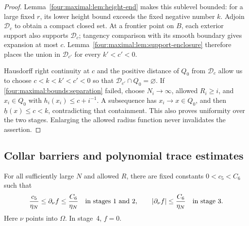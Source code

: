 \begin{proof}
Lemma~\ref{four:maximal:lem:height-end} makes this sublevel bounded: for a large
fixed $r$, its lower height bound exceeds the fixed negative number
$k$. Adjoin $\mathcal D_c$ to obtain a compact closed set. At a frontier
point on $B$, each exterior support also supports $\mathcal D_c$;
tangency comparison with its smooth boundary gives expansion at most
$c$. Lemma~\ref{four:maximal:lem:support-enclosure} therefore places the union in
$\mathcal D_{c'}$ for every $k'<c'<0$.

Hausdorff right continuity at $c$ and the positive distance of $Q_0$
from $\mathcal D_c$ allow us to choose $c<k<k'<c'<0$ so that
$\mathcal D_{c'}\cap Q_0=\varnothing$. If
\eqref{four:maximal:bounds:separation} failed, choose $N_i\to\infty$, allowed
$R_i\ge i$, and $x_i\in Q_0$ with $h_i(x_i)\le c+i^{-1}$.
A subsequence has $x_i\to x\in Q_0$, and then
$\underline h(x)\le c<k$, contradicting that containment.
This also proves uniformity over the two stages. Enlarging the allowed
radius function never invalidates the assertion.
\end{proof}

\subsection{Collar barriers and polynomial trace estimates}

\begin{lemma}\label{four:maximal:lem:collar-slopes}
For all sufficiently large $N$ and allowed $R$, there are fixed
constants $0<c_5<C_6$ such that
\begin{equation}\label{four:maximal:bounds:collar-slopes}
 \frac{c_5}{\eta_N}\le\partial_\nu f\le\frac{C_6}{\eta_N}
 \quad\hbox{in stages 1 and 2},\qquad
 |\partial_\nu f|\le\frac{C_6}{\eta_N}
 \quad\hbox{in stage 3}.
\end{equation}
Here $\nu$ points into $\Omega$. In stage~4, $f=0$.
\end{lemma}

